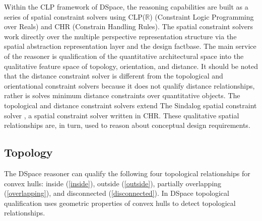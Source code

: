 \documentclass[12pt]{ucthesis}
\begin{document}
Within the CLP framework of DSpace, the reasoning capabilities are built as a series of spatial constraint solvers using CLP($\mathbb{R}$) (Constraint Logic Programming over Reals) and CHR (Constrain Handling Rules). The spatial constraint solvers work directly over the multiple perspective representation structure via the spatial abstraction representation layer and the design factbase. The main service of the reasoner is qualification of the quantitative architectural space into the qualitative feature space of topology, orientation, and distance. It should be noted that the distance constraint solver is different from the topological and orientational constraint solvers because it does not qualify distance relationships, rather is solves minimum distance constraints over quantitative objects. The topological and distance constraint solvers extend The Sindalog spatial constraint solver \cite{Sindalong}, a spatial constraint solver written in CHR. These qualitative spatial relationships are, in turn, used to reason about conceptual design requirements.

\subsection{Topology}
The DSpace reasoner can qualify the following four topological relationships for convex hulls: inside (\ref{inside}), outside (\ref{outside}), partially overlapping (\ref{overlapping}), and disconnected (\ref{disconnected}). In DSpace topological qualification uses geometric properties of convex hulls to detect topological relationships. 
\end{document}
